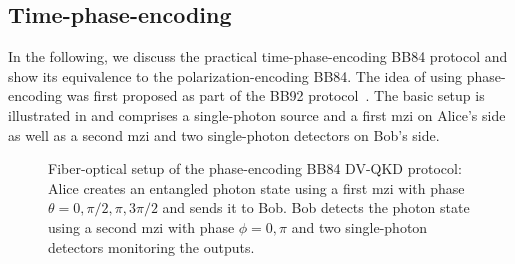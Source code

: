 \FloatBarrier
\subsection{Time-phase-encoding}

In the following, we discuss the practical time-phase-encoding BB84 protocol and show its equivalence to the polarization-encoding BB84.
The idea of using phase-encoding was first proposed as part of the BB92 protocol~\cite{Bennett1992}.
The basic setup is illustrated in  and comprises a single-photon source and a first \gls{mzi} on Alice's side as well as a second \gls{mzi} and two single-photon detectors on Bob's side.
\begin{figure}[htb]
	\centering
	
	\caption{Fiber-optical setup of the phase-encoding BB84 DV-QKD protocol: Alice creates an entangled photon state using a first \gls{mzi} with phase $\theta=0,\pi/2,\pi,3\pi/2$ and sends it to Bob. Bob detects the photon state using a second \gls{mzi} with phase $\phi=0,\pi$ and two single-photon detectors monitoring the outputs.}\label{fig:time_phase_encoding_bb84}
\end{figure}

